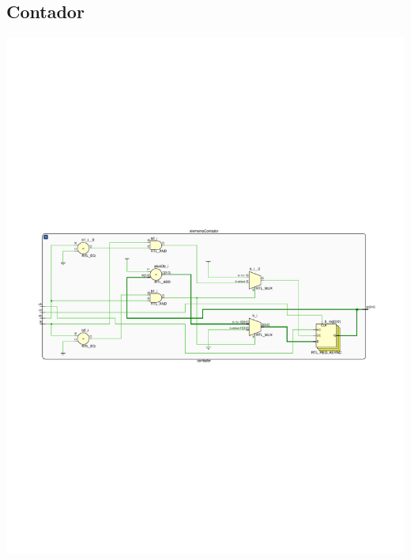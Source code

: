 \documentclass[8pt,executivepaper]{article}
\begin{document}
\subsection{Contador}
\begin{center}
  \includegraphics[scale=0.7]{rtl/contador.pdf}
\end{center}
\end{document}
